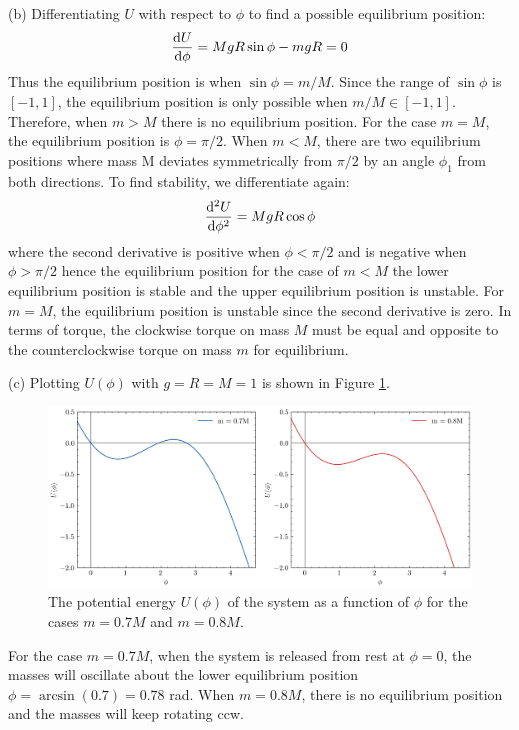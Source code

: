 \documentclass[../problems.tex]{subfiles}
\begin{document}
(b) Differentiating $U$ with respect to $\phi$ to find a possible equilibrium position:
\begin{align*}
    \dv{U}{\phi} = MgR\sin\phi - mgR = 0
\end{align*}
Thus the equilibrium position is when $\sin\phi = m/M$. Since the range of $\sin\phi$ is $[-1, 1]$,
the equilibrium position is only possible when $m/M \in [-1, 1]$. Therefore, when $m > M$ there is
no equilibrium position. For the case $m = M$, the equilibrium position is $\phi = \pi/2$. When $m <
M$, there are two equilibrium positions where mass M deviates symmetrically from $\pi/2$ by an angle
$\phi_1$ from both directions. To find stability, we differentiate again:
\begin{align*}
    \dv[2]{U}{\phi} = MgR\cos\phi
\end{align*}
where the second derivative is positive when $\phi < \pi/2$ and is negative when $\phi > \pi/2$
hence the equilibrium position for the case of $m < M$ the lower equilibrium position is stable and
the upper equilibrium position is unstable. For $m = M$, the equilibrium position is unstable since
the second derivative is zero. In terms of torque, the clockwise torque on mass $M$ must be equal
and opposite to the counterclockwise torque on mass $m$ for equilibrium.

(c) Plotting $U(\phi)$ with $g = R = M = 1$ is shown in Figure \ref{fig:4_37}.
\begin{figure}[ht]
    \centering
    \includegraphics[scale=0.7]{../images/fig4_37.png}
    \captionsetup{width=0.8\textwidth}
    \caption{The potential energy $U(\phi)$ of the system as a function of $\phi$ for the cases
    $m = 0.7M$ and $m = 0.8M$.}
    \label{fig:4_37}
\end{figure}
For the case $m = 0.7M$, when the system is released from rest at $\phi = 0$, the masses will
oscillate about the lower equilibrium position $\phi = \arcsin(0.7) = 0.78$ rad. When $m = 0.8M$,
there is no equilibrium position and the masses will keep rotating ccw.
\end{document}
